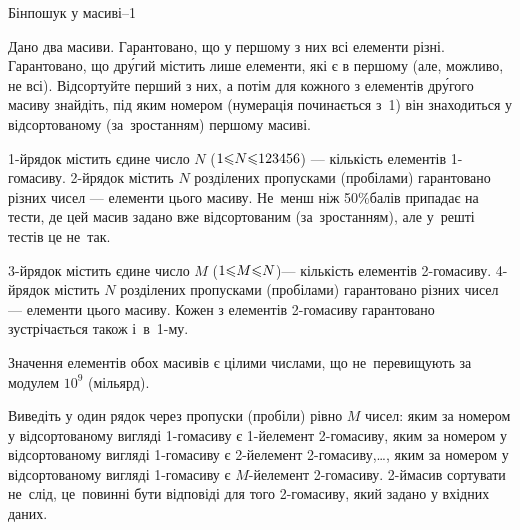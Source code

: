 ﻿\begin{problemAllDefault}{Бінпошук у масиві--1}

Дано два масиви. Гарантовано, що у першому з них всі елементи різні. Гарантовано, що др\'{у}гий містить лише елементи, які є в першому (але, можливо, не всі). Відсортуйте перший з них, а потім для кожного з елементів др\'{у}гого масиву знайдіть, під яким номером (нумерація починається з~1) він знаходиться у відсортованому (за~зростанням) першому масиві.

\InputFile
\mbox{1-й}\nolinebreak[3] рядок містить єдине число $N$ ($1{\leqslant}N{\leqslant}123456$) --- кількість елементів \mbox{1-го}\nolinebreak[3] масиву. \mbox{2-й}\nolinebreak[3] рядок містить $N$ розділених пропусками (пробілами) гарантовано різних чисел --- елементи цього масиву. Не~менш ніж \mbox{50\%}\nolinebreak[3] балів припадає на тести, де цей масив задано вже відсортованим (за~зростанням), але у~решті тестів це не~так.

\mbox{3-й}\nolinebreak[3] рядок містить єдине число $M$ ($1{\leqslant}M{\leqslant}N$)\nolinebreak[3] --- кількість елементів \mbox{2-го}\nolinebreak[3] масиву. \mbox{4-й}\nolinebreak[3] рядок містить $N$ розділених пропусками (пробілами) гарантовано різних чисел\nolinebreak[3] --- елементи цього масиву. Кожен з елементів \mbox{2-го}\nolinebreak[3] масиву гарантовано зустрічається також і~в~\mbox{1-му}.

Значення елементів обох масивів є цілими числами, що не~перевищують за модулем $10^9$ (мільярд).

\OutputFile
Виведіть у один рядок через пропуски (пробіли) рівно $M$ чисел: яким за номером у відсортованому вигляді \mbox{1-го}\nolinebreak[3] масиву є \mbox{1-й}\nolinebreak[3] елемент \mbox{2-го}\nolinebreak[3] масиву, яким за номером у відсортованому вигляді \mbox{1-го}\nolinebreak[3] масиву є \mbox{2-й}\nolinebreak[3] елемент \mbox{2-го}\nolinebreak[3] масиву,\nolinebreak[2] \dots, яким за номером у відсортованому вигляді \mbox{1-го}\nolinebreak[3] масиву є \mbox{$M$-й}\nolinebreak[3] елемент \mbox{2-го}\nolinebreak[3] масиву. \mbox{2-й}\nolinebreak[3] масив сортувати не~слід, це~повинні бути відповіді для того \mbox{2-го}\nolinebreak[3] масиву, який задано у вхідних даних.

\Example

\begin{example}
%
\end{example}

\end{problemAllDefault}


